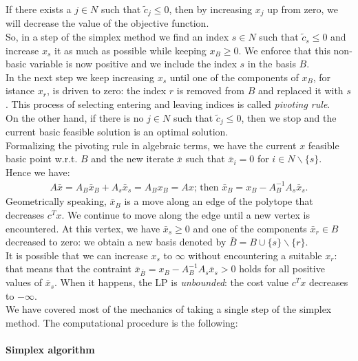 \documentclass[a4paper,10 pt,titlepage,twoside]{book}
\theoremstyle{plain}
\theoremstyle{definition}
\theoremstyle{remark}
\begin{document}
 If there exists a $j \in N$ such that $\widetilde{c}_{j} \leq 0$, then by increasing $x_{j}$ up from zero, we will decrease the value of the objective function.\\
So, in a step of the simplex method we find an index $s \in N$ such that $\widetilde{c}_{s} \leq 0$ and increase $x_{s}$ it as much as possible while keeping $x_{B} \geq 0$. We enforce that this non-basic variable is now positive and we include the index $s$ in the basis $B$.\\
In the next step we keep increasing $x_{s}$ until one of the components of $x_{B}$, for istance $x_{r}$, is driven to zero: the index $r$ is removed from $B$ and replaced it with $s$. This process of selecting entering and leaving indices is called \textit{pivoting rule}. \\
On the other hand, if there is no $j \in N$ such that $\widetilde{c}_{j} \leq 0$, then we stop and the current basic feasible solution is an optimal solution. \\
Formalizing the pivoting rule in algebraic terms, we have the current $x$ feasible basic point w.r.t. $B$ and the new iterate $\bar{x}$ such that $\bar{x}_{i} = 0$ for $i \in N\backslash\{s\}$.\\
Hence we have: 
\begin{align*}
	A\bar{x} = A_{B}\bar{x}_{B} +A_{s}\bar{x}_{s} = A_{B}x_{B} = Ax \text{;  then }
	\bar{x}_{B} = x_{B} - A_{B}^{-1}A_{s}\bar{x}_{s}.
\end{align*}
Geometrically speaking, $\bar{x}_{B}$ is a move along an edge of the polytope that decreases $c^{T}x$. We continue to move along the edge until a new vertex is encountered. At this vertex, we have $\bar{x}_{s}\geq0$ and one of the components $\bar{x}_{r}\in B$ decreased to zero: we obtain a new basis denoted by $\bar{B} = B \cup \{s\} \backslash \{r\}$.\\
It is possible that we can increase $x_{s}$ to $\infty$ without encountering a suitable $x_{r}$: that means that the contraint $\bar{x}_{\bar{B}} = x_{B} - A_{B}^{-1}A_{s}\bar{x}_{s}>0$ holds for all positive values of $\bar{x}_{s}$. When it happens, the LP is \textit{unbounded}: the cost value $c^{T}x$ decreases to $-\infty$.\\
We have covered most of the mechanics of taking a single step of the simplex method. The computational procedure is the following:\\ 
\\
\textbf{Simplex algorithm}
\end{document}
